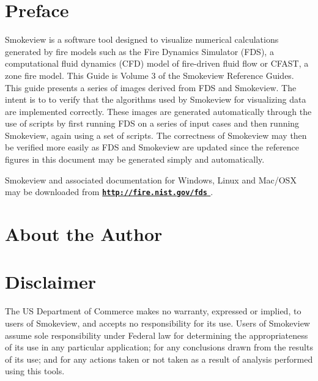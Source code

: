 \documentclass[11pt,twoside]{book}
\newcommand{\hhref}[1]{\href{#1}{{\tt #1}
}}
\begin{document}
\chapter{Preface}
Smokeview is a software tool designed to visualize numerical
calculations generated by fire models such as the Fire Dynamics Simulator (FDS),
a computational fluid dynamics (CFD) model of fire-driven fluid
flow or CFAST, a zone fire model. This Guide is Volume 3 of the Smokeview Reference
Guides.
This guide presents a series of images derived from FDS and Smokeview.  The intent is to to verify that the algorithms used by Smokeview for visualizing data are implemented correctly.  These images are generated automatically through the use of scripts by first running FDS on a series of input cases and then running Smokeview, again using a set of scripts.  The correctness of Smokeview may then be verified more easily as FDS and Smokeview are updated since the reference figures in this document may be generated simply and automatically.

Smokeview and associated
documentation for Windows, Linux and Mac/OSX may be downloaded from  {\bf
\hhref{http://fire.nist.gov/fds}} .


\chapter{About the Author}
\begin{description}

\end{description}


\chapter{Disclaimer}

The US Department of Commerce makes no warranty,
expressed or implied, to users of Smokeview, and accepts no
responsibility for its use. Users of Smokeview assume sole
responsibility under Federal law for determining the
appropriateness of its use in any particular application; for any
conclusions drawn from the results of its use; and for any actions
taken or not taken as a result of analysis performed using this
tools.
\end{document}
